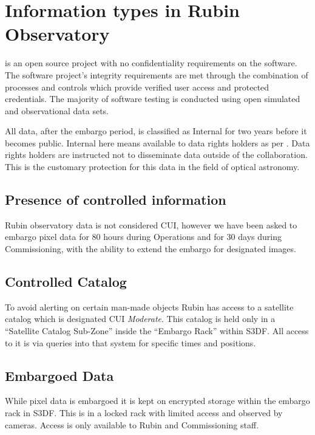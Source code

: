 \section{Information types in Rubin Observatory} \label{sec:infotypes}

\VRO is an open source project with no confidentiality requirements on the \gls{software}.
The \gls{software} project’s integrity requirements are met through the combination of
processes and controls which provide verified user access and protected credentials.
The majority of \gls{software} testing is conducted using open simulated and observational data sets.

All data, after the embargo period,  is classified as Internal for two years before it becomes public.
Internal here means available to data rights holders as per .
Data rights holders are instructed not to disseminate data outside of the collaboration.
This is the customary protection for this data in the field of optical astronomy.

\subsection{Presence of controlled information}\label{sec:cui}
Rubin observatory data is not considered \gls{CUI}, however we have been asked to embargo pixel data for 80 hours during \gls{Operations} and for 30 days during Commissioning, with the ability to extend the embargo for designated images.

\subsection{Controlled Catalog}\label{sec:controllescat}
To avoid alerting on certain man-made objects Rubin has access to a satellite catalog which is designated \gls{CUI}  \emph{Moderate}.
This catalog is held only in a ``Satellite Catalog Sub-Zone'' inside the ``Embargo Rack'' within \gls{S3DF}.
All access to it is via queries into that system for specific times and positions.

\subsection{Embargoed Data} \label{sec:embargo}
While pixel data is embargoed it is kept on encrypted storage within the embargo rack in \gls{S3DF}.
This is in a locked rack with limited access and observed by cameras.
Access is only available to Rubin and \gls{Commissioning} staff.

